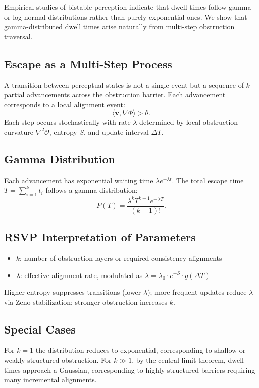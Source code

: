 \documentclass[12pt,a4paper]{article}
\begin{document}
Empirical studies of bistable perception indicate that dwell times follow gamma or log-normal distributions rather than purely exponential ones. We show that gamma-distributed dwell times arise naturally from multi-step obstruction traversal.

\subsection{Escape as a Multi-Step Process}

A transition between perceptual states is not a single event but a sequence of $k$ partial advancements across the obstruction barrier. Each advancement corresponds to a local alignment event:
\[
\langle \mathbf{v}, \nabla\Phi \rangle > \theta.
\]
Each step occurs stochastically with rate $\lambda$ determined by local obstruction curvature $\nabla^2\mathcal{O}$, entropy $S$, and update interval $\Delta T$.

\subsection{Gamma Distribution}

Each advancement has exponential waiting time $\lambda e^{-\lambda t}$. The total escape time $T = \sum_{i=1}^k t_i$ follows a gamma distribution:
\[
P(T) = \frac{\lambda^k T^{k-1} e^{-\lambda T}}{(k-1)!}.
\]

\subsection{RSVP Interpretation of Parameters}

\begin{itemize}[noitemsep]
\item $k$: number of obstruction layers or required consistency alignments
\item $\lambda$: effective alignment rate, modulated as $\lambda = \lambda_0 \cdot e^{-S} \cdot g(\Delta T)$
\end{itemize}

Higher entropy suppresses transitions (lower $\lambda$); more frequent updates reduce $\lambda$ via Zeno stabilization; stronger obstruction increases $k$.

\subsection{Special Cases}

For $k=1$ the distribution reduces to exponential, corresponding to shallow or weakly structured obstruction. For $k \gg 1$, by the central limit theorem, dwell times approach a Gaussian, corresponding to highly structured barriers requiring many incremental alignments.
\end{document}
